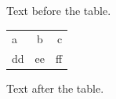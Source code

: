 \documentclass[12pt]{article}
\begin{document}
Text before the table.

\begin{tabular}{|l|c|r|}a & b & c\\dd & ee & ff\end{tabular}

Text after the table.
\end{document}
